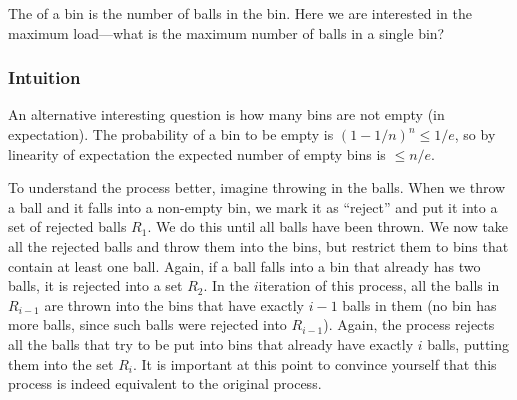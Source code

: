 The  of a bin is the number of balls in the
bin. Here we are interested in the maximum load---what is the maximum
number of balls in a single bin?

\subsubsection{Intuition}

\begin{observation}
    An alternative interesting question is how many bins are not empty
    (in expectation). The probability of a bin to be empty is
    $(1-1/n)^n \leq 1/e$, so by linearity of expectation the expected number
    of empty bins is $\leq n/e$.
\end{observation}

To understand the process better, imagine throwing in the balls. When we
throw a ball and it falls into a non-empty bin, we mark it as ``reject''
and put it into a set of rejected balls $R_1$. We do this until all balls
have been thrown. We now take all the rejected balls and throw them into
the bins, but restrict them to bins that contain at least one ball.
Again, if a ball falls into a bin that already has two balls, it is
rejected into a set $R_2$. In the $i$\th iteration of this process, all
the balls in $R_{i-1}$ are thrown into the bins that have exactly $i-1$
balls in them (no bin has more balls, since such balls were rejected into
$R_{i-1}$). Again, the process rejects all the balls that try to be put
into bins that already have exactly $i$ balls, putting them into the set
$R_i$. It is important at this point to convince yourself that this
process is indeed equivalent to the original process.

